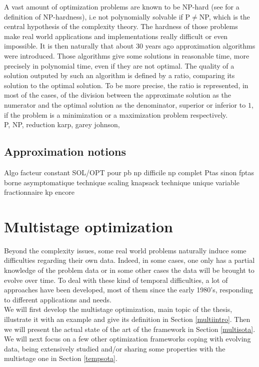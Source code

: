 \documentclass[a4paper]{book}
\begin{document}
 A vast amount of optimization problems are known to be NP-hard (see \cite{gj} for a definition of NP-hardness), i.e not polynomially solvable if P$\ne$NP, which is the central hypothesis of the complexity theory. The hardness of those problems make real world applications and implementations really difficult or even impossible. It is then naturally that about 30 years ago approximation algorithms were introduced. Those algorithms give some solutions in reasonable time, more precisely in polynomial time, even if they are not optimal. The quality of a solution outputed by such an algorithm is defined by a ratio, comparing its solution to the optimal solution. To be more precise, the ratio is represented, in most of the cases, of the division between the approximate solution as the numerator and the optimal solution as the denominator, superior or inferior to $1$, if the problem is a minimization or a maximization problem respectively.\\
P, NP, reduction karp, garey johnson, 
\subsection{Approximation notions}
Algo facteur constant SOL/OPT pour pb np difficile np complet
Ptas sinon 
fptas
borne asymptomatique 
technique scaling knapsack 
technique unique variable fractionnaire kp encore 


\section{Multistage optimization}
Beyond the complexity issues, some real world problems naturally induce some difficulties regarding their own data. Indeed, in some cases, one only has a partial knowledge of the problem data or in some other cases the data will be brought to evolve over time. To deal with these kind of temporal difficulties, a lot of approaches have been developed, most of them since the early 1980's, responding to different applications and needs. \\
We will first develop the multistage optimization, main topic of the thesis, illustrate it with an example and give its definition in Section \ref{multiintro}. Then we will present the actual state of the art of the framework in Section \ref{multisota}. \\
We will next focus on a few other optimization frameworks coping with evolving data, being extensively studied and/or sharing some properties with the multistage one in Section \ref{tempsota}. 
\end{document}
